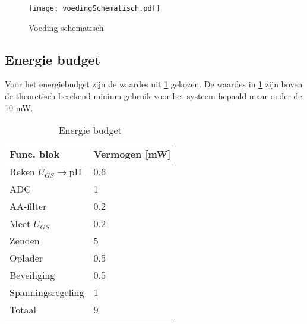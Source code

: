 \begin{figure}[ht]
    \centering 
    \texttt{[image: voedingSchematisch.pdf]}
    \caption{Voeding schematisch}
    \label{fig:voedingSchematisch}
\end{figure}



\subsection{Energie budget}
Voor het energiebudget zijn de waardes uit \cref{tab:energieBudgetEstimatie} gekozen. De waardes in \cref{tab:energieBudgetEstimatie} zijn boven de theoretisch berekend minium gebruik voor het systeem bepaald maar onder de 10 mW.


\begin{table}[ht]
    \centering
    \begin{tabular}{l|l}
        Func. blok          & Vermogen [mW] \\
        \hline                              
        Reken $U_{GS}\rightarrow$pH & 0.6   \\
        ADC                 & 1             \\
        AA-filter           & 0.2           \\
        Meet $U_{GS}$       & 0.2           \\
        Zenden              & 5             \\
        Oplader             & 0.5           \\
        Beveiliging         & 0.5           \\
        Spanningsregeling   & 1             \\ 
        \hline
        \hline
        Totaal              & 9
        
    \end{tabular}
    \caption{Energie budget}
    \label{tab:energieBudgetEstimatie}
\end{table}


